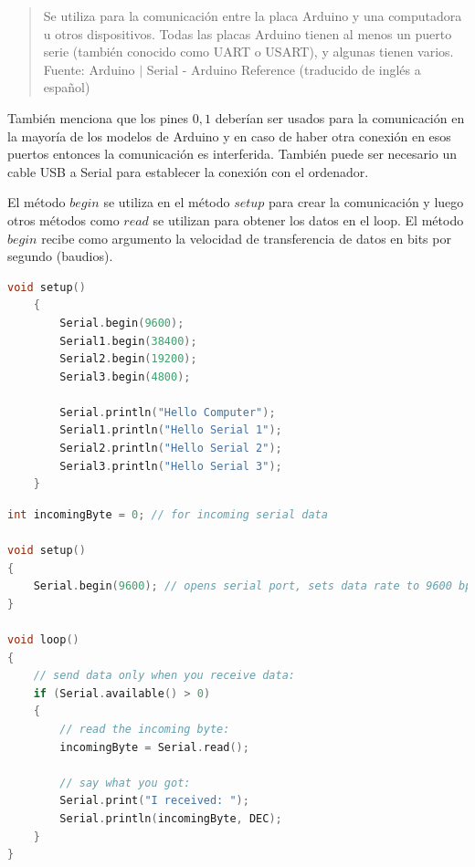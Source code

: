 \documentclass{article}
\begin{document}
    \begin{quote}
        Se utiliza para la comunicación entre la placa Arduino y una
        computadora u otros dispositivos. Todas las placas Arduino tienen al
        menos un puerto serie (también conocido como UART o USART), y algunas
        tienen varios.\\ \footnotesize
        Fuente: Arduino $\mid$ Serial - Arduino Reference (traducido de
        inglés a español)~\cite{arduino-serial}
    \end{quote}

    También menciona que los pines $0,1$ deberían ser usados para la
    comunicación en la mayoría de los modelos de Arduino y en caso de haber
    otra conexión en esos puertos entonces la comunicación es interferida.
    También puede ser necesario un cable USB a Serial para establecer la
    conexión con el ordenador.

    \bigbreak

    El método $begin$ se utiliza en el método $setup$ para crear la
    comunicación y luego otros métodos como $read$ se utilizan para obtener
    los datos en el loop. El método $begin$ recibe como argumento la
    velocidad de transferencia de datos en bits por segundo (baudios).

    \bigbreak

    \begin{lstlisting}[language=C, caption=Uso de Serial en Arduino Mega con
    todos sus puertos Seriales. \footnotesize Fuente: Serial - Arduino
    Reference (begin)~\cite{arduino-serial}]
    void setup()
    {
        Serial.begin(9600);
        Serial1.begin(38400);
        Serial2.begin(19200);
        Serial3.begin(4800);

        Serial.println("Hello Computer");
        Serial1.println("Hello Serial 1");
        Serial2.println("Hello Serial 2");
        Serial3.println("Hello Serial 3");
    }
\end{lstlisting}

\begin{lstlisting}[language=C, caption=Uso del método read. \footnotesize
Fuente: Serial - Arduino Reference (read)~\cite{arduino-serial}]
int incomingByte = 0; // for incoming serial data

void setup()
{
    Serial.begin(9600); // opens serial port, sets data rate to 9600 bps
}

void loop()
{
    // send data only when you receive data:
    if (Serial.available() > 0)
    {
        // read the incoming byte:
        incomingByte = Serial.read();

        // say what you got:
        Serial.print("I received: ");
        Serial.println(incomingByte, DEC);
    }
}
\end{lstlisting}
\end{document}
